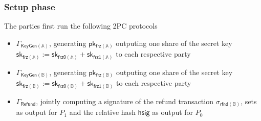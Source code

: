 \documentclass{article}      	%
\begin{document}
\subsubsection*{Setup phase}
The parties first run the following 2PC protocols 
\begin{itemize}
    \item  $\Gamma_{\mathsf{KeyGen(\mathbb{A})}}$, generating $\mathsf{pk_{frz(\mathbb{A})}}$ outputing one share of the secret key $\mathsf{sk_{frz(\mathbb{A})}} := \mathsf{sk_{frz0(\mathbb{A})}} + \mathsf{sk_{frz1(\mathbb{A})}}$ to each respective party 
    \item  $\Gamma_{\mathsf{KeyGen(\mathbb{B})}}$, generating $\mathsf{pk_{frz(\mathbb{B})}}$ outputing one share of the secret key $\mathsf{sk_{frz(\mathbb{B})}} := \mathsf{sk_{frz0(\mathbb{B})}} + \mathsf{sk_{frz1(\mathbb{B})}}$ to each respective party
    \item  $\Gamma_{\mathsf{Refund}}$, jointly computing a signature of the refund transaction $\sigma_{\mathsf{rfnd(\mathbb{B})}}$, sets as output for $P_1$ and the relative hash $\mathsf{hsig}$ as output for $P_0$
\end{itemize}
\end{document}
